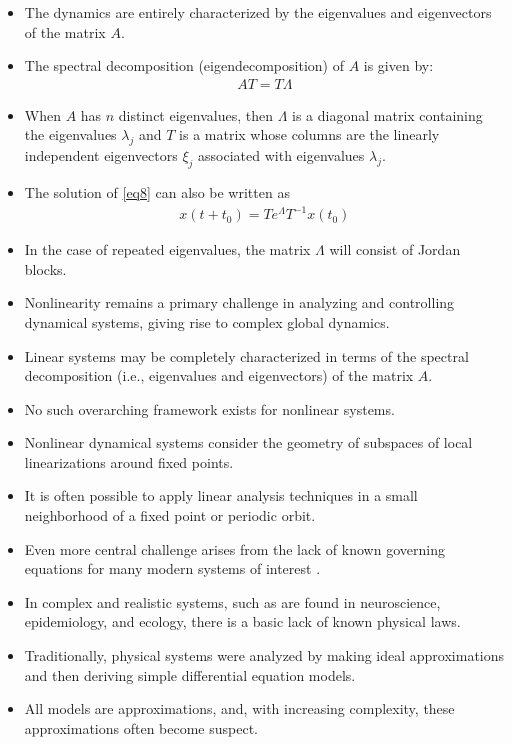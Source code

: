 \documentclass[hyperref={pdfpagemode=FullScreen},aspectratio=169]{beamer}
\begin{document}
\begin{frame}{}
\begin{itemize}
\setlength\itemsep{1em}
\item The dynamics are entirely characterized by the eigenvalues and eigenvectors of the matrix $A$.
\item The spectral decomposition (eigendecomposition) of $A$ is given by:
\begin{align}
AT = T\Lambda
\end{align}
\item When $A$ has $n$ distinct eigenvalues, then $\Lambda$ is a diagonal matrix containing the eigenvalues $\lambda_j$ and $T$ is a matrix whose columns are the linearly independent eigenvectors $\xi_j$ associated with eigenvalues $\lambda_j$.
\item The solution of \cref{eq8} can also be written as
\begin{align}
x(t+t_0) = Te^\Lambda T^{-1}x(t_0)
\end{align}
\item In the case of repeated eigenvalues, the matrix $\Lambda$ will consist of Jordan blocks.
\item Nonlinearity remains a primary challenge in analyzing and controlling dynamical systems, giving rise to complex global dynamics.
\item Linear systems may be completely characterized in terms of the spectral decomposition (i.e., eigenvalues and eigenvectors) of the matrix $A$.
\end{itemize}
\end{frame}
\begin{frame}{}
\begin{itemize}
\setlength\itemsep{1em}
\item No such overarching framework exists for nonlinear systems.
\item Nonlinear dynamical systems consider the geometry of subspaces of local linearizations around fixed points.
\item It is often possible to apply  linear analysis techniques in a small neighborhood of a fixed point or periodic orbit.
\item Even more central challenge arises from the lack of known governing equations for many modern systems of interest .
\item In complex and realistic systems, such as are found in neuroscience, epidemiology, and ecology,  there is a basic lack of known physical laws.
\item Traditionally, physical systems were analyzed by making ideal approximations and then deriving simple differential equation models.
\item All models are approximations, and, with increasing complexity, these approximations often become suspect. 
\end{itemize}
\end{frame}
\end{document}
